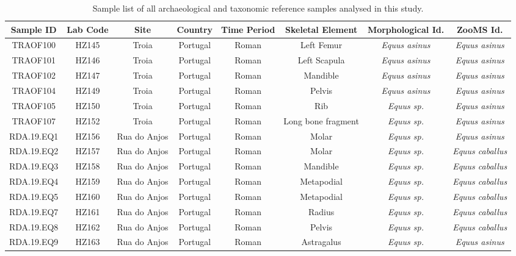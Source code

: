\documentclass[preprint, 3p, authoryear]{elsarticle} %
\begin{document}
\begin{landscape}\begin{table}

\caption{\label{tab:eqtable3}Sample list of all archaeological and taxonomic reference samples analysed in this study.}
\centering
\fontsize{7}{9}\selectfont
\begin{tabular}[t]{cccccc>{}c>{}c}
\toprule
Sample ID & Lab Code & Site & Country & Time Period & Skeletal Element & Morphological Id. & ZooMS Id.\\
\midrule
TRAOF100 & HZ145 & Troia & Portugal & Roman & Left Femur & \em{Equus asinus} & \em{Equus asinus}\\
TRAOF101 & HZ146 & Troia & Portugal & Roman & Left Scapula & \em{Equus asinus} & \em{Equus asinus}\\
TRAOF102 & HZ147 & Troia & Portugal & Roman & Mandible & \em{Equus asinus} & \em{Equus asinus}\\
TRAOF104 & HZ149 & Troia & Portugal & Roman & Pelvis & \em{Equus asinus} & \em{Equus asinus}\\
TRAOF105 & HZ150 & Troia & Portugal & Roman & Rib & \em{Equus {\normalfont sp.}} & \em{Equus asinus}\\
TRAOF107 & HZ152 & Troia & Portugal & Roman & Long bone fragment & \em{Equus {\normalfont sp.}} & \em{Equus asinus}\\
RDA.19.EQ1 & HZ156 & Rua do Anjos & Portugal & Roman & Molar & \em{Equus {\normalfont sp.}} & \em{Equus asinus}\\
RDA.19.EQ2 & HZ157 & Rua do Anjos & Portugal & Roman & Molar & \em{Equus {\normalfont sp.}} & \em{Equus caballus}\\
RDA.19.EQ3 & HZ158 & Rua do Anjos & Portugal & Roman & Mandible & \em{Equus {\normalfont sp.}} & \em{Equus caballus}\\
RDA.19.EQ4 & HZ159 & Rua do Anjos & Portugal & Roman & Metapodial & \em{Equus {\normalfont sp.}} & \em{Equus caballus}\\
RDA.19.EQ5 & HZ160 & Rua do Anjos & Portugal & Roman & Metapodial & \em{Equus {\normalfont sp.}} & \em{Equus caballus}\\
RDA.19.EQ7 & HZ161 & Rua do Anjos & Portugal & Roman & Radius & \em{Equus {\normalfont sp.}} & \em{Equus caballus}\\
RDA.19.EQ8 & HZ162 & Rua do Anjos & Portugal & Roman & Pelvis & \em{Equus {\normalfont sp.}} & \em{Equus caballus}\\
RDA.19.EQ9 & HZ163 & Rua do Anjos & Portugal & Roman & Astragalus & \em{Equus {\normalfont sp.}} & \em{Equus asinus}\\

\end{tabular}
\end{table}
\end{landscape}
\end{document}
